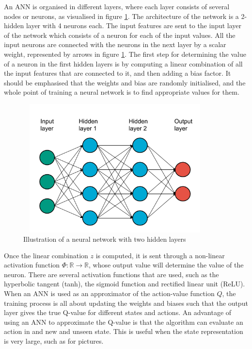 \documentclass[class=book, crop=false]{standalone}
\begin{document}
An ANN is organised in different layers, where each layer consists of several nodes or neurons, as visualised in figure \ref{fig:theory:neural_network}. The architecture of the network is a 2-hidden layer with 4 neurons each. The input features are sent to the input layer of the network which consists of a neuron for each of the input values. All the input neurons are connected with the neurons in the next layer by a scalar weight, represented by arrows in figure \ref{fig:theory:neural_network}. The first step for determining the value of a neuron in the first hidden layers is by computing a linear combination of all the input features that are connected to it, and then adding a bias factor. It should be emphasised that the weights and bias are randomly initialised, and the whole point of training a neural network is to find appropriate values for them.
\begin{figure}[ht!]
    \center
    \includegraphics[height=7cm, width=10cm]{figures/neural_network.png}
    \caption[size = 9]{Illustration of a neural network with two hidden layers}
    \label{fig:theory:neural_network}
\end{figure}
Once the linear combination $z$ is computed, it is sent through a non-linear activation function $\Phi: \mathbb{R} \to \mathbb{R}$, whose output value will determine the value of the neuron. There are several activation functions that are used, such as the hyperbolic tangent (tanh), the sigmoid function and rectified linear unit (ReLU). When an ANN is used as an approximator of the action-value function $Q$, the training process is all about updating the weights and biases such that the output layer gives the true Q-value for different states and actions. An advantage of using an ANN to approximate the Q-value is that the algorithm can evaluate an action in and new and unseen state. This is useful when the state representation is very large, such as for pictures. 
\end{document}
